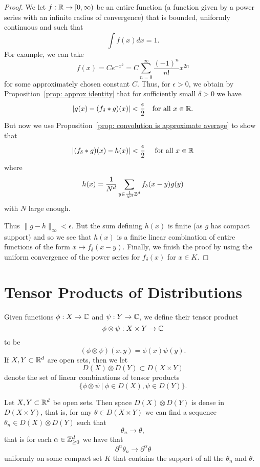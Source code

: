 \documentclass[twoside, a4paper, 10pt]{amsart}
\begin{document}
\begin{proof} We let $f:\mathbb{R} \to [0,\infty)$ be an entire function (a function given by a power series with an infinite radius of convergence) that is bounded, uniformly continuous and such that $$\int f(x) dx = 1.$$ For example, we can take $$f(x) = C e^{-x^2} = C \sum_{n=0}^{\infty} \frac{(-1)^n}{n!} x^{2n}$$ for some approximately chosen constant $C$. Thus, for $\epsilon>0$, we obtain by Proposition~\ref{prop: approx identity} that for sufficiently small $\delta>0$ we have $$|g(x) - (f_{\delta}*g)(x)| < \frac{\epsilon}{2} \quad \text{for all } x \in \mathbb{R}.$$ But now we use Proposition~\ref{prop: convolution is approximate average}  to show that $$|(f_{\delta}*g) (x) - h(x)| < \frac{\epsilon}{2} \quad \text{ for all } x \in \mathbb{R}$$ where $$h(x) = \frac{1}{N^d} \sum_{y \in \frac{1}{N^d}\mathbb{Z}^d} f_{\delta}(x-y) g(y)$$ with $N$ large enough.

 Thus $\|g - h \|_{\infty} < \epsilon$. But the sum defining $h(x)$ is finite (as $g$ has compact support) and so we see that $h(x)$ is a finite linear combination of entire functions of the form $x \mapsto f_{\delta}(x-y)$. Finally, we finish the proof by using the uniform convergence of the power series for $f_{\delta}(x)$ for $x \in K$. \end{proof}

\section{Tensor Products of Distributions}

Given functions $\phi:X \to \mathbb{C}$ and $\psi:Y \to \mathbb{C}$, we define their tensor product $$\phi \otimes \psi:X \times Y \to \mathbb{C}$$ to be $$(\phi \otimes \psi)(x,y) = \phi(x) \psi(y).$$ If $X,Y \subset \mathbb{R}^d$ are open sets, then we let $$D(X) \otimes D(Y) \subset D(X \times Y)$$ denote the set of linear combinations of tensor products $$\{\phi \otimes \psi ~|~ \phi \in D(X), \psi \in D(Y) \}.$$

\begin{prop} Let $X,Y \subset \mathbb{R}^d$ be open sets. Then space $D(X) \otimes D(Y)$ is dense in $D(X \times Y)$, that is, for any $\theta \in D(X \times Y)$ we can find a sequence $\theta_n \in D(X) \otimes D(Y)$ such that $$\theta_n \to \theta,$$ that is for each $\alpha \in \mathbb{Z}^d_{\geq 0 }$ we have that $$\partial^{\alpha} \theta_n \to \partial^{\alpha} \theta$$ uniformly on some compact set $K$ that contains the support of all the $\theta_n$ and $\theta$.

\end{prop}
\end{document}
